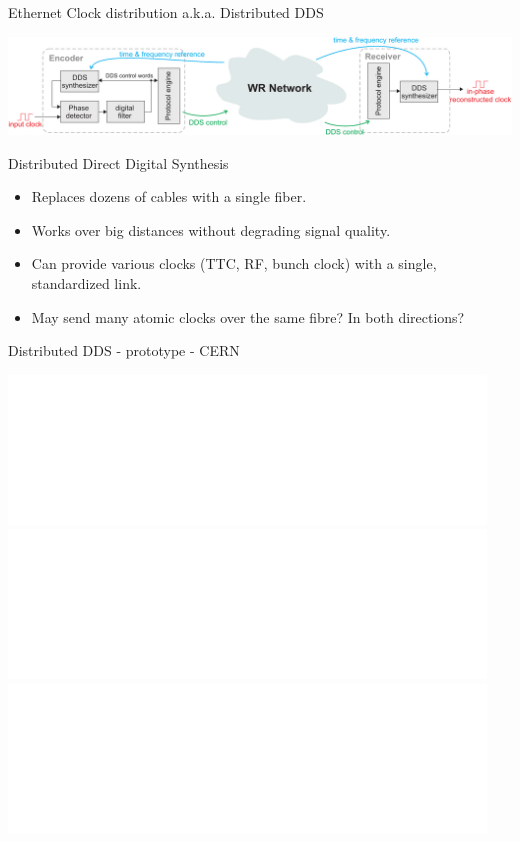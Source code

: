\documentclass[compress,red]{beamer}
\begin{document}
\begin{frame}{Ethernet Clock distribution a.k.a. Distributed DDS}
  \begin{center}
    \includegraphics[width=\columnwidth]{applications/remote_dds.pdf}
  \end{center}
  \begin{block}{Distributed Direct Digital Synthesis}
    \begin{itemize}
    \item Replaces dozens of cables with a single fiber.
    \item Works over big distances without degrading signal quality.
    \item Can provide various clocks (TTC, RF, bunch clock) with a single, standardized link.
    \item May send many atomic clocks over the same fibre? In both directions?
    \end{itemize}
  \end{block}
\end{frame}



\begin{frame}{Distributed DDS - prototype - CERN}
  \begin{center}
    \includegraphics<1>[width=0.95\textwidth]{applications/rf_demo6.pdf} \pause
    \includegraphics<2>[width=0.95\textwidth]{applications/rf_demo5.pdf} \pause
    \includegraphics<3>[width=0.95\textwidth]{applications/rf_demo8.pdf}
    \end{center}
\end{frame}
\end{document}
